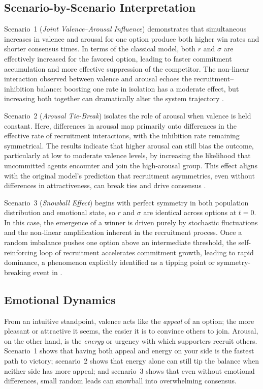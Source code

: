 \documentclass[a4paper,twoside]{article}
\begin{document}
\subsection{Scenario-by-Scenario Interpretation}
Scenario~1 (\emph{Joint Valence--Arousal Influence}) demonstrates that simultaneous increases in valence and arousal for one option produce both higher win rates and shorter consensus times. 
In terms of the classical model, both $r$ and $\sigma$ are effectively increased for the favored option, leading to faster commitment accumulation and more effective suppression of the competitor. 
The non-linear interaction observed between valence and arousal echoes the recruitment--inhibition balance: boosting one rate in isolation has a moderate effect, but increasing both together can dramatically alter the system trajectory \cite{Chase25}.

Scenario~2 (\emph{Arousal Tie-Break}) isolates the role of arousal when valence is held constant. 
Here, differences in arousal map primarily onto differences in the effective rate of recruitment interactions, with the inhibition rate remaining symmetrical. 
The results indicate that higher arousal can still bias the outcome, particularly at low to moderate valence levels, by increasing the likelihood that uncommitted agents encounter and join the high-arousal group. 
This effect aligns with the original model's prediction that recruitment asymmetries, even without differences in attractiveness, can break ties and drive consensus \cite{pais2013mechanism}.

Scenario~3 (\emph{Snowball Effect}) begins with perfect symmetry in both population distribution and emotional state, so $r$ and $\sigma$ are identical across options at $t=0$. 
In this case, the emergence of a winner is driven purely by stochastic fluctuations and the non-linear amplification inherent in the recruitment process. 
Once a random imbalance pushes one option above an intermediate threshold, the self-reinforcing loop of recruitment accelerates commitment growth, leading to rapid dominance, a phenomenon explicitly identified as a tipping point or symmetry-breaking event in \cite{pais2013mechanism,Chase25}.

\subsection{Emotional Dynamics}
From an intuitive standpoint, valence acts like the \emph{appeal} of an option; the more pleasant or attractive it seems, the easier it is to convince others to join. 
Arousal, on the other hand, is the \emph{energy} or urgency with which supporters recruit others. 
Scenario~1 shows that having both appeal and energy on your side is the fastest path to victory; scenario~2 shows that energy alone can still tip the balance when neither side has more appeal; and scenario~3 shows that even without emotional differences, small random leads can snowball into overwhelming consensus.
\end{document}
